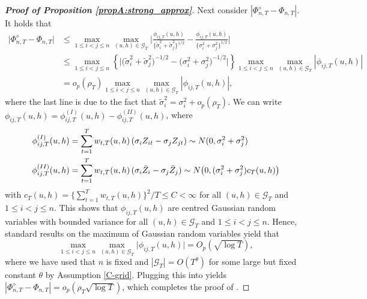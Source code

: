 \documentclass[12pt]{article}
\makeatletter
\renewcommand{\eqref}[1]{\tagform@{\ref{#1}}}
\makeatother
\begin{document}
\begin{proof}[\textnormal{\textbf{Proof of Proposition \ref{propA:strong_approx}}}]
Next consider $|\Phi_{n, T}^{\diamond} - \Phi_{n, T}|$. It holds that
\begin{align}
\big| \Phi_{n, T}^{\diamond} - \Phi_{n, T} \big| 
 & \le \max_{1\leq i< j \leq n}\max_{(u,h) \in \mathcal{G}_T} \Big|\frac{\phi_{ij, T}(u,h)}{\{\widetilde{\sigma}_i^2 + \widetilde{\sigma}_j^2 \}^{1/2}} - \frac{\phi_{ij, T}(u,h)}{\{{\sigma}_i^2 + {\sigma}_j^2 \}^{1/2}}\Big| \nonumber \\
 & \le \max_{1 \le i < j \le n} \left\{ \Big|\big(\widetilde{\sigma}_i^2 + \widetilde{\sigma}_j^2 \big)^{-1/2} - \big(\sigma_i^2 + \sigma_j^2 \big)^{-1/2}\Big| \right\} \max_{1 \le i < j \le n} \max_{(u,h) \in \mathcal{G}_T} \left|\phi_{ij,T}(u,h)\right| \nonumber \\
 & = o_p(\rho_T)  \max_{1 \le i < j \le n} \max_{(u,h) \in \mathcal{G}_T} \left|\phi_{ij,T}(u,h)\right|, \label{eqA:strong_approx:bound5}
\end{align}
where the last line is due to the fact that $\widetilde{\sigma}_i^2 = \sigma_i^2 + o_p(\rho_T)$. We can write $\phi_{ij, T}(u,h) = \phi_{ij, T}^{(I)}(u,h) - \phi_{ij, T}^{(II)}(u,h)$, where
\begin{align*} 
\phi_{ij, T}^{(I)}(u,h) & = \sum\limits_{t=1}^T w_{t,T}(u,h) \, (\sigma_i Z_{it} - \sigma_j Z_{jt}) \sim N(0,{\sigma}^2_i + {\sigma}^2_j) \\
\phi_{ij, T}^{(II)}(u,h) & = \sum\limits_{t=1}^T w_{t,T}(u,h) \, ( \sigma_i \bar{Z}_i - \sigma_j \bar{Z}_j) \sim N\big(0, (\sigma_i^2 + \sigma_j^2) c_T(u,h)\big) 
\end{align*}
with $c_T(u,h) = \{\sum_{t=1}^T w_{t, T}(u, h)\}^2/T \le C < \infty$ for all $(u,h) \in \mathcal{G}_T$ and $1\le i < j \le n$. This shows that $\phi_{ij, T}(u,h)$ are centred Gaussian random variables with bounded variance for all $(u,h) \in \mathcal{G}_T$ and $1\le i < j \le n$. Hence, standard results on the maximum of Gaussian random variables yield that 
\begin{equation}\label{eq:phi-bound-max-Gaussians}
\max_{1\leq i< j \leq n}\max_{(u,h) \in \mathcal{G}_T} \big|\phi_{ij, T}(u,h)\big| = O_p(\sqrt{\log T}),
\end{equation}
where we have used that $n$ is fixed and $|\mathcal{G}_T| = O(T^\theta)$ for some large but fixed constant $\theta$ by Assumption \ref{C-grid}. Plugging this into \eqref{eqA:strong_approx:bound5} yields 
$| \Phi_{n, T}^{\diamond} - \Phi_{n, T} | = o_p(\rho_T \sqrt{\log T})$, which completes the proof of \eqref{eq-strongapprox-bound-B}.
\end{proof}
\end{document}
